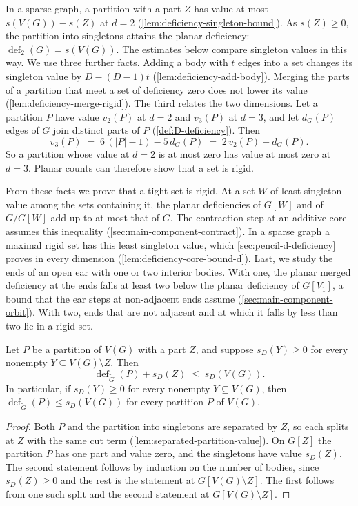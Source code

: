 In a sparse graph, a partition with a part $Z$ has value at most
$s(V(G)) - s(Z)$ at $d = 2$ (\cref{lem:deficiency-singleton-bound}). As
$s(Z) \ge 0$, the partition into singletons attains the planar
deficiency: $\operatorname{def}_2(G) = s(V(G))$. The estimates below
compare singleton values in this way. We use three further facts. Adding
a body with $t$ edges into a set changes its singleton value by
$D - (D - 1)t$ (\cref{lem:deficiency-add-body}). Merging the parts of a
partition that meet a set of deficiency zero does not lower its value
(\cref{lem:deficiency-merge-rigid}). The third relates the two
dimensions. Let a partition $P$ have value $v_2(P)$ at $d = 2$ and
$v_3(P)$ at $d = 3$, and let $d_G(P)$ edges of $G$ join distinct parts
of $P$ (\cref{def:D-deficiency}). Then
\[
  v_3(P) \;=\; 6\,(|P| - 1) - 5\,d_G(P) \;=\; 2\,v_2(P) - d_G(P).
\]
So a partition whose value at $d = 2$ is at most zero has value at most
zero at $d = 3$. Planar counts can therefore show that a set is rigid.

From these facts we prove that a tight set is rigid. At a set $W$ of
least singleton value among the sets containing it, the planar
deficiencies of $G[W]$ and of $G/G[W]$ add up to at most that of $G$.
The contraction step at an additive core assumes this inequality
(\cref{sec:main-component-contract}). In a sparse graph a maximal rigid
set has this least singleton value, which \cref{sec:pencil-d-deficiency}
proves in every dimension (\cref{lem:deficiency-core-bound-d}). Last, we
study the ends of an open ear with one or two interior bodies. With one,
the planar merged deficiency at the ends falls at least two below the
planar deficiency of $G[V_1]$, a bound that the ear steps at
non-adjacent ends assume (\cref{sec:main-component-orbit}). With two,
ends that are not adjacent and at which it falls by less than two lie in
a rigid set.

\begin{lemma}
  \label{lem:deficiency-singleton-bound}
  \leanok
  Let $P$ be a partition of $V(G)$ with a part $Z$, and suppose
  $s_D(Y) \ge 0$ for every nonempty $Y \subseteq V(G) \setminus Z$.
  Then
  \[
    \operatorname{def}_{\tilde G}(P) + s_D(Z) \;\le\; s_D(V(G)).
  \]
  In particular, if $s_D(Y) \ge 0$ for every nonempty $Y \subseteq
  V(G)$, then $\operatorname{def}_{\tilde G}(P) \le s_D(V(G))$ for every
  partition $P$ of $V(G)$.
\end{lemma}
\begin{proof}
  \leanok
  Both $P$ and the partition into singletons are separated by $Z$, so
  each splits at $Z$ with the same cut term
  (\cref{lem:separated-partition-value}). On $G[Z]$ the partition $P$ has
  one part and value zero, and the singletons have value $s_D(Z)$. The
  second statement follows by induction on the number of bodies, since
  $s_D(Z) \ge 0$ and the rest is the statement at $G[V(G) \setminus
  Z]$. The first follows from one such split and the second statement
  at $G[V(G) \setminus Z]$.
\end{proof}


